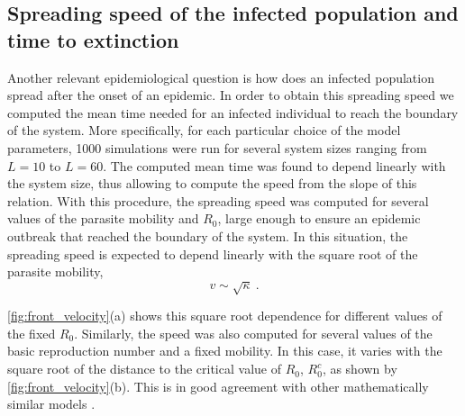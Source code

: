 \subsection{Spreading speed of the infected population and time to extinction}

Another relevant epidemiological question is how does an infected
population spread after the onset of an epidemic. In order to obtain this
spreading speed we computed the mean time needed for an infected individual to
reach the boundary of the system. More specifically, for each particular choice
of the model parameters, 1000 simulations were run for several system sizes
ranging from $L=10$ to $L=60$. The computed mean time was found to depend
linearly with the system size, thus allowing to compute the speed from the
slope of this relation. With this procedure, the spreading speed was computed
for several values of the parasite mobility and $R_0$, large enough to ensure
an epidemic outbreak that reached the boundary of the system. In this
situation, the spreading speed is expected to depend linearly with the square
root of the parasite mobility,
\begin{equation}\label{eq:front_vel}
    v\sim\sqrt{\kappa} \ .
\end{equation}

\cref{fig:front_velocity}(a) shows this square root dependence for
different values of the fixed $R_0$. Similarly, the speed was also computed for
several values of the basic reproduction number and a fixed mobility. In this
case, it varies with the square root of the distance to the critical value of
$R_0$, $R_0^c$, as shown by \cref{fig:front_velocity}(b). This is in good
agreement with other mathematically similar models \cite{Bertuzzo2010}.

